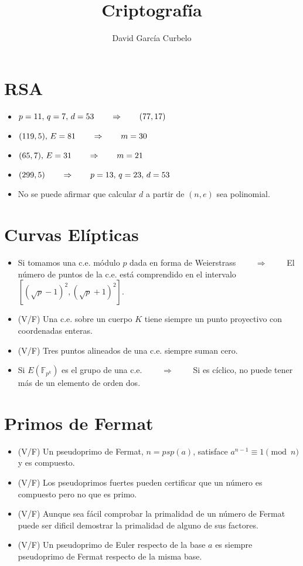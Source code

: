 \documentclass[fleqn]{article}
\author{David García Curbelo}
\title{Criptografía}
\def\F{\mathds{F}}
\def\next{\qquad \Rightarrow \qquad}
\begin{document}
    \section{RSA}
    \begin{itemize}
        \item $p = 11, \thinspace q = 7, \thinspace d = 53 \next (77, 17)$
        \item $(119, 5), \thinspace E = 81 \next m = 30$
        \item $(65, 7), \thinspace E = 31 \next m = 21$
        \item $(299, 5) \next p = 13, \thinspace q = 23, \thinspace d = 53$
        \item No se puede afirmar que calcular $d$ a partir de $(n, e)$ sea polinomial.
    \end{itemize}

    \section{Curvas Elípticas}
    \begin{itemize}
        \item Si tomamos una c.e. módulo $p$ dada en forma de Weierstrass $\next$ El número de puntos de la c.e. está comprendido en el intervalo $[(\sqrt{p} - 1)^2, (\sqrt{p} + 1)^2]$.
        \item (V/F) Una c.e. sobre un cuerpo $K$ tiene siempre un punto proyectivo con coordenadas enteras.
        \item (V/F) Tres puntos alineados de una c.e. siempre suman cero.
        \item Si $E(\F_{p^k})$ es el grupo de una c.e. $\next$ Si es cíclico, no puede tener más de un elemento de orden dos.
    \end{itemize}

    \section{Primos de Fermat}
    \begin{itemize}
        \item (V/F) Un pseudoprimo de Fermat, $n = psp(a)$, satisface $a^{n-1} \equiv 1 \pmod{n}$ y es compuesto.
        \item (V/F) Los pseudoprimos fuertes pueden certificar que un número es compuesto pero no que es primo.
        \item (V/F) Aunque sea fácil comprobar la primalidad de un número de Fermat puede ser dificil demostrar la primalidad de alguno de sus factores.
        \item (V/F) Un pseudoprimo de Euler respecto de la base $a$ es siempre pseudoprimo de Fermat respecto de la misma base.
    \end{itemize}
\end{document}
